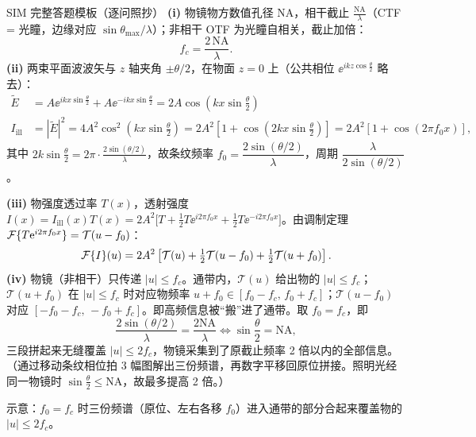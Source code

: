 \begin{exam}{SIM 完整答题模板（逐问照抄）}
\textbf{(i)} 物镜物方数值孔径 NA，相干截止 $\frac{\mathrm{NA}}{\lambda}$（CTF = 光瞳，边缘对应 $\sin\theta_{\max}/\lambda$）；非相干 OTF 为光瞳自相关，截止加倍：
\[
f_c=\frac{2\,\mathrm{NA}}{\lambda}.
\]
\textbf{(ii)} 两束平面波波矢与 $z$ 轴夹角 $\pm\theta/2$，在物面 $z=0$ 上（公共相位 $\ee^{ikz\cos\frac\theta2}$ 略去）：
\begin{align*}
\tilde E&=A\ee^{ikx\sin\frac\theta2}+A\ee^{-ikx\sin\frac\theta2}=2A\cos\!\left(kx\sin\tfrac\theta2\right)\\
I_{\text{ill}}&=|\tilde E|^2=4A^2\cos^2\!\left(kx\sin\tfrac\theta2\right)=2A^2\left[1+\cos\!\left(2kx\sin\tfrac\theta2\right)\right]=2A^2[1+\cos(2\pi f_0x)],
\end{align*}
其中 $2k\sin\frac\theta2=2\pi\cdot\frac{2\sin(\theta/2)}{\lambda}$，故条纹频率 $f_0=\dfrac{2\sin(\theta/2)}{\lambda}$，周期 $\dfrac{\lambda}{2\sin(\theta/2)}$。

\textbf{(iii)} 物强度透过率 $T(x)$，透射强度 $I(x)=I_{\text{ill}}(x)T(x)=2A^2\big[T+\frac12T\ee^{i2\pi f_0x}+\frac12T\ee^{-i2\pi f_0x}\big]$。由调制定理 $\mathcal{F}\{T\mathrm{e}^{i2\pi f_0x}\}=\mathcal T(u-f_0)$：
\[
\mathcal{F}\{I\}(u)=2A^2\left[\mathcal T(u)+\tfrac12\mathcal T(u-f_0)+\tfrac12\mathcal T(u+f_0)\right].
\]
\textbf{(iv)} 物镜（非相干）只传递 $|u|\le f_c$。通带内，$\mathcal T(u)$ 给出物的 $|u|\le f_c$；$\mathcal T(u+f_0)$ 在 $|u|\le f_c$ 时对应物频率 $u+f_0\in[f_0-f_c,\,f_0+f_c]$；$\mathcal T(u-f_0)$ 对应 $[-f_0-f_c,\,-f_0+f_c]$。即高频信息被“搬”进了通带。取 $f_0=f_c$，即
\[
\frac{2\sin(\theta/2)}{\lambda}=\frac{2\mathrm{NA}}{\lambda}\iff\sin\frac\theta2=\mathrm{NA},
\]
三段拼起来无缝覆盖 $|u|\le2f_c$，物镜采集到了原截止频率 2 倍以内的全部信息。（通过移动条纹相位拍 3 幅图解出三份频谱，再数字平移回原位拼接。照明光经同一物镜时 $\sin\frac\theta2\le\mathrm{NA}$，故最多提高 2 倍。）
\end{exam}

\begin{center}
\end{center}
\begin{center}\small 示意：$f_0=f_c$ 时三份频谱（原位、左右各移 $f_0$）进入通带的部分合起来覆盖物的 $|u|\le2f_c$。\end{center}

